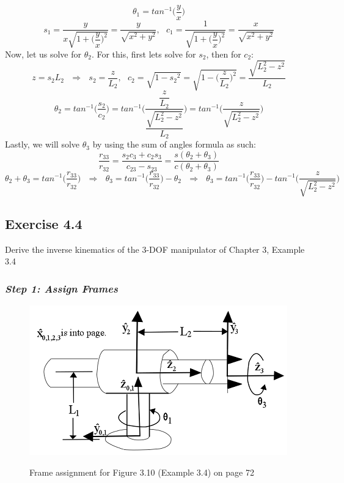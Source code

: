 \documentclass[10pt]{article}
\begin{document}
\[
\theta_{1} = {tan^{-1}}\bigg(\dfrac{y}{x}\bigg)\]
\[
s_{1} = \dfrac{y}{x\sqrt{1 + \bigg(\dfrac{y}{x}\bigg)^2}} =
\dfrac{y}{\sqrt{x^2 + y^2}}, \mbox{     }
c_{1} = \dfrac{1}{\sqrt{1 + \bigg(\dfrac{y}{x}\bigg)^2}} =
\dfrac{x}{\sqrt{x^2 + y^2}}
\]
Now, let us solve for $\theta_{2}$.  For this, first lets solve for $s_{2}$, then for $c_{2}$:
\[z = s_{2}L_{2}\mbox{   } \Rightarrow \mbox{   }
s_{2} = \dfrac{z}{L_2}, \mbox{    }
c_{2} = \sqrt{1-{s_{2}}^{2}} = 
\sqrt{1-\bigg(\dfrac{z}{L_2}\bigg)^{2}} =
\dfrac{\sqrt{L_{2}^2 - z^2}}{L_2}
\]
\[
\theta_{2} = tan^{-1}\bigg(\dfrac{s_{2}}{c_{2}}\bigg) =
tan^{-1}\Bigg(\dfrac{\dfrac{z}{L_2}}{\dfrac{\sqrt{L_{2}^2 - z^2}}{L_2}}\Bigg) =
tan^{-1}\bigg(\dfrac{z}{\sqrt{L_{2}^2 - z^2}}\bigg)
\]
Lastly, we will solve $\theta_{3}$ by using the sum of angles formula as such:
\[
\dfrac{r_{33}}{r_{32}} = \dfrac{s_{2}c_{3}+c_{2}s_{3}}{c_{23}-s_{23}} =
\dfrac{s(\theta_{2} + \theta_{3})}{c(\theta_{2} + \theta_{3})}
\]
\[
\theta_{2} + \theta_{3} = tan^{-1}\bigg(\dfrac{r_{33}}{r_{32}}\bigg) 
\mbox{     } \Rightarrow \mbox{      } 
\theta_{3} = tan^{-1}\bigg(\dfrac{r_{33}}{r_{32}}\bigg) - \theta_{2}
\mbox{     } \Rightarrow \mbox{      }
\theta_{3} = tan^{-1}\bigg(\dfrac{r_{33}}{r_{32}}\bigg) - tan^{-1}\bigg(\dfrac{z}{\sqrt{L_{2}^2 - z^2}}\bigg)
\]
\subsection*{Exercise 4.4}
Derive the inverse kinematics of the 3-DOF manipulator of Chapter 3, Example 3.4
\subsubsection*{\textit{\textbf{Step 1: Assign Frames}}}
\begin{figure}[!h]
\centering
\includegraphics[]{Fig310}
\it{\caption{Frame assignment for Figure 3.10 (Example 3.4) on page 72\cite{textbook}}}
\end{figure}
\end{document}
